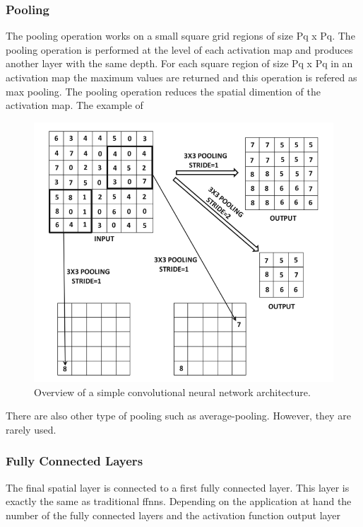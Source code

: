 \subsubsection{Pooling}
The pooling operation works on a small square grid regions of size Pq x Pq. The pooling operation is performed at the level of each activation map and produces another layer with the same depth. For each square region of size Pq x Pq in an activation map the maximum values are returned and this operation is refered as max pooling. The pooling operation reduces the spatial dimention of the activation map. The example of
\begin{figure}[h]
\centering
 \includegraphics[width=\linewidth]{Figures/fig_cnn_pooling.png}
 \caption{Overview of a simple convolutional neural network architecture.}
 \label{fig:cnn_convolution}
\end{figure}



There are also other type of pooling such as average-pooling. However, they are rarely used. 
\subsubsection{Fully Connected Layers}
The final spatial layer is connected to a first fully connected layer. This layer is exactly the same as traditional ffnns. Depending on the application at hand the number of the fully connected layers and the activation function output layer  


